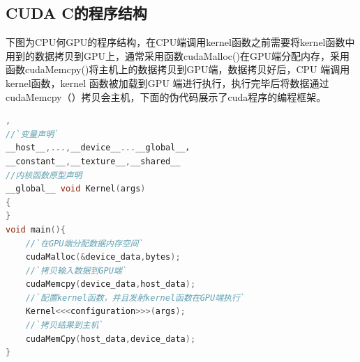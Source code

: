 \subsection{CUDA C的程序结构}
下图为CPU何GPU的程序结构，在CPU端调用kernel函数之前需要将kernel函数中用到的数据拷贝到GPU上，通常采用函数cudaMalloc()在GPU端分配内存，采用函数cudaMemcpy()将主机上的数据拷贝到GPU端，数据拷贝好后，CPU 端调用kernel函数，kernel 函数被加载到GPU 端进行执行，执行完毕后将数据通过cudaMemcpy（）拷贝会主机，下面的伪代码展示了cuda程序的编程框架。\newline
\begin{lstlisting}[language=C],
//`变量声明`
__host__,...,__device__...__global__，
__constant__,__texture__,__shared__
//内核函数原型声明
__global__ void Kernel(args)
{
}
void main(){
    //`在GPU端分配数据内存空间`
    cudaMalloc(&device_data,bytes);
    //`拷贝输入数据到GPU端`
    cudaMemcpy(device_data,host_data);
    //`配置kernel函数，并且发射kernel函数在GPU端执行`
    Kernel<<<configuration>>>(args);
    //`拷贝结果到主机`
    cudaMemCpy(host_data,device_data);
}
\end{lstlisting}
